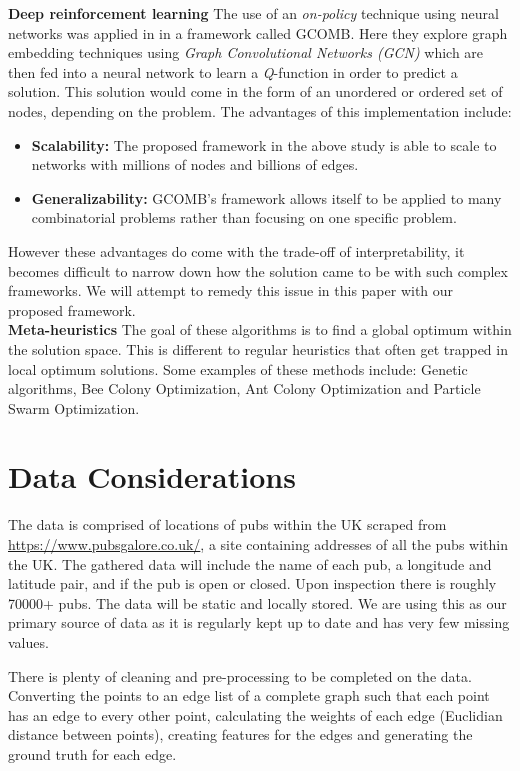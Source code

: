\documentclass[]{UCD_CS_FYP_Report}
\begin{document}
\textbf{Deep reinforcement learning}
The use of an \textit{on-policy} technique using neural networks was applied in \cite{DeepRL} in a framework called \textsc{GCOMB}. Here they explore graph embedding techniques using \textit{Graph Convolutional Networks (GCN)} which are then fed into a neural network to learn a \textit{Q}-function in order to predict a solution. This solution would come in the form of an unordered or ordered set of nodes, depending on the problem. The advantages of this implementation include: 
\begin{itemize}
  \item \textbf{Scalability: }The proposed framework in the above study is able to scale to networks with millions of nodes and billions of edges.
  \item \textbf{Generalizability: }\textsc{GCOMB}'s framework allows itself to be applied to many combinatorial problems rather than focusing on one specific problem.
\end{itemize}
However these advantages do come with the trade-off of interpretability, it becomes difficult to narrow down how the solution came to be with such complex frameworks. We will attempt to remedy this issue in this paper with our proposed framework.\\[0.5cm]
\textbf{Meta-heuristics} The goal of these algorithms is to find a global optimum within the solution space. This is different to regular heuristics that often get trapped in local optimum solutions. Some examples of these methods include: Genetic algorithms, Bee Colony Optimization, Ant Colony Optimization and Particle Swarm Optimization.





\chapter{Data Considerations}
The data is comprised of locations of pubs within the UK scraped from \url{https://www.pubsgalore.co.uk/}, a site containing addresses of all the pubs within the UK. The gathered data will include the name of each pub, a longitude and latitude pair, and if the pub is open or closed.  Upon inspection there is roughly 70000+ pubs. The data will be static and locally stored. We are using this as our primary source of data as it is regularly kept up to date and has very few missing values.

There is plenty of cleaning and pre-processing to be completed on the data. Converting the points to an edge list of a complete graph such that each point has an edge to every other point, calculating the weights of each edge (Euclidian distance between points), creating features for the edges and generating the ground truth for each edge.
\end{document}
